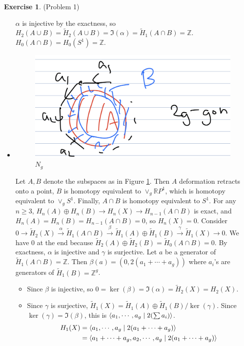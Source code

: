 \documentclass[psamsfonts]{amsart}
\theoremstyle{definition}
\newtheorem*{exer}{Exercise}
\theoremstyle{remark}
\numberwithin{equation}{section}
\begin{document}
\begin{exer}{(Problem 1)}
\begin{itemize}
       $\alpha$ is injective by the exactness, so $H_2(A \cup B) = \tilde{H}_2(A \cup B) = \Im(\alpha) = \tilde{H}_1(A \cap B) = \mathbb{Z}$.
       $H_0(A \cap B) = H_0(S^1) = \mathbb{Z}$.
     \item
       \begin{figure}
       \includegraphics[width=.5\linewidth]{2g.jpeg}
       \caption{$N_g$}
       \label{fig:ng}
       \end{figure}
       Let $A, B$ denote the subspaces as in Figure \ref{fig:ng}.
       Then $A$ deformation retracts onto a point, $B$ is homotopy equivalent to $\vee_g \mathbb{R}P^1$, which is homotopy equivalent to $\vee_gS^1$.
       Finally, $A \cap B$ is homotopy equivalent to $S^1$.
       For any $n \geq 3$, $H_n(A) \oplus H_n(B) \rightarrow H_n(X) \rightarrow H_{n - 1}(A \cap B)$ is exact, and $H_n(A) = H_n(B) = H_{n - 1}(A \cap B) = 0$, so $H_n(X) = 0$.
       Consider $0 \rightarrow \tilde{H}_2(X) \xrightarrow{\alpha} \tilde{H}_1(A \cap B) \xrightarrow{\beta} \tilde{H}_1(A) \oplus \tilde{H}_1(B) \xrightarrow{\gamma} \tilde{H}_1(X) \rightarrow 0$.
       We have 0 at the end because $\tilde{H}_2(A) \oplus \tilde{H}_2(B) = \tilde{H}_0(A \cap B) = 0$.
       By exactness, $\alpha$ is injective and $\gamma$ is surjective.
       Let $a$ be a generator of $\tilde{H}_1(A \cap B) = \mathbb{Z}$.
       Then $\beta(a) = (0, 2(a_1 + \cdots + a_g))$ where $a_i$'s are generators of $\tilde{H}_1(B) = \mathbb{Z}^g$.
       \begin{itemize}
         \item
           Since $\beta$ is injective, so $0 = \ker(\beta) = \Im(\alpha) = \tilde{H}_2(X) = H_2(X)$.
         \item
           Since $\gamma$ is surjective, $\tilde{H}_1(X) = \tilde{H}_1(A) \oplus \tilde{H}_1(B) / \ker(\gamma)$.
           Since $\ker(\gamma) = \Im(\beta)$, this is $\ev{a_1, \cdots, a_g \mid 2(\sum a_i)}$.
           \begin{align*}
             H_1(X)
               &= \ev{a_1, \cdots, a_g \mid 2(a_1 + \cdots + a_g)} \\
               &= \ev{a_1 + \cdots + a_g, a_2, \cdots, a_g \mid 2(a_1 + \cdots + a_g)} \\

\end{align*}
\end{itemize}
\end{itemize}
\end{exer}
\end{document}
